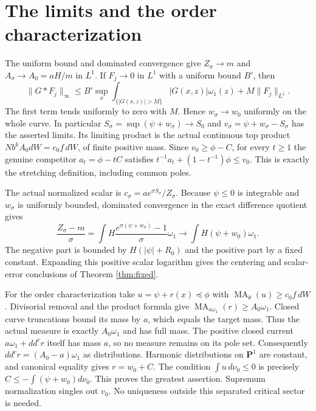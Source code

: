 \documentclass[11pt]{article}
\newcommand{\ddc}{dd^c}
\newcommand{\MA}{\operatorname{MA}}
\newcommand{\Pone}{\mathbf P^1}
\theoremstyle{remark}\newtheorem{remark}[theorem]{Remark}
\begin{document}
\section{The limits and the order characterization}

The uniform bound and dominated convergence give
$Z_\sigma\to m$ and $A_\sigma\to A_0=aH/m$ in $L^1$.
If $F_j\to0$ in $L^1$ with a uniform bound $B'$, then
\[
 \|G*F_j\|_\infty
 \leq B'\sup_x\int_{\{|G(x,z)|>M\}}|G(x,z)|\omega_1(z)
       +M\|F_j\|_{L^1}.
\]
The first term tends uniformly to zero with $M$. Hence
$w_\sigma\to w_0$ uniformly on the whole curve. In particular
$S_\sigma=\sup(\psi+w_\sigma)\to S_0$ and
$v_\sigma=\psi+w_\sigma-S_\sigma$ has the asserted limits.
Its limiting product is the actual continuous top product
$N b^kA_0dW=c_0 f\,dW$, of finite positive mass.
Since $v_0\geq\phi-C$, for every $t\geq1$ the genuine competitor
$a_t=\phi-tC$ satisfies
$t^{-1}a_t+(1-t^{-1})\phi\leq v_0$.
This is exactly the stretching definition, including common poles.

The actual normalized scalar is $c_\sigma=a e^{\sigma S_\sigma}/Z_\sigma$.
Because $\psi\leq0$ is integrable and $w_\sigma$ is uniformly bounded,
dominated convergence in the exact difference quotient gives
\[
 \frac{Z_\sigma-m}{\sigma}
 =\int H\frac{e^{\sigma(\psi+w_\sigma)}-1}{\sigma}\omega_1
 \longrightarrow\int H(\psi+w_0)\omega_1.
\]
The negative part is bounded by $H(|\psi|+R_0)$ and the positive part
by a fixed constant. Expanding this positive scalar logarithm gives the
centering and scalar-error conclusions of Theorem \ref{thm:fixed}.

For the order characterization take $u=\psi+r(x)\preceq\phi$ with
$\MA_\theta(u)\geq c_0 f\,dW$.
Divisorial removal and the product formula give
$\MA_{a\omega_1}(r)\geq A_0\omega_1$.
Closed curve truncations bound its mass by $a$, which equals the target mass.
Thus the actual measure is exactly $A_0\omega_1$ and has full mass.
The positive closed current $a\omega_1+\ddc r$ itself has mass $a$,
so no measure remains on its pole set. Consequently
$\ddc r=(A_0-a)\omega_1$ as distributions. Harmonic distributions on
$\Pone$ are constant, and canonical equality gives $r=w_0+C$.
The condition $\int u\,d\nu_0\leq0$ is precisely
$C\leq-\int(\psi+w_0)d\nu_0$. This proves the greatest assertion.
Supremum normalization singles out $v_0$. No uniqueness outside this
separated critical sector is needed.
\end{document}
